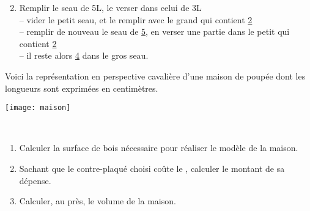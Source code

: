 \begin{colonne*exercice}
\begin{corrige}
\Coupe

   \begin{enumerate}
   \setcounter{enumi}{1}
      \item Remplir le seau de 5L, le verser dans celui de 3L \\
         -- vider le petit seau, et le remplir avec le grand qui contient \ul{2} \\
         -- remplir de nouveau le seau de \ul{5}, en verser une partie dans le petit qui contient \ul{2} \\
         -- il reste alors \ul{4} dans le gros seau.
   \end{enumerate}
\end{corrige}

\bigskip


\begin{exercice} %
   Voici la représentation en perspective cavalière d'une maison de poupée dont les longueurs sont exprimées en centimètres.
   \begin{center}
      \texttt{[image: maison]}
   \end{center}
   \ \\ [-12mm]
   \begin{enumerate}
      \item Calculer la surface de bois nécessaire pour réaliser le modèle de la maison.
      \item Sachant que le contre-plaqué choisi coûte  le \umq{}, calculer le montant de sa dépense.
      \item Calculer, au \udmc{} près, le volume de la maison.
   \end{enumerate}
\end{exercice}


\end{colonne*exercice}
